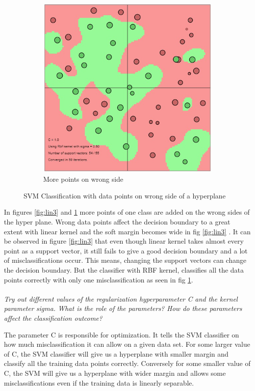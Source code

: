 \documentclass[12pt]{report}
\begin{document}
{\begin{figure}[ht]
\begin{subfigure}{.3\textwidth}
 			\includegraphics[width=.7\linewidth]{RBF_kernel_3.jpg}
 			\caption{More points on wrong side}
 			\label{fig:rbf3}
 		\end{subfigure}
	 	\caption{SVM Classification with data points on wrong side of a hyperplane}
	 	\label{fig:lin_rbf2}
	\end{figure}
 
    
In figures \ref{fig:lin3} and \ref{fig:rbf3} more points of one class are added on the wrong sides of the hyper plane. Wrong data points affect the decision boundary to a great extent with linear kernel and the soft margin becomes wide in fig \ref{fig:lin3} . It can be observed in figure \ref{fig:lin3} that even though linear kernel takes almost every point as a support vector, it still fails to give a good decision boundary and a lot of misclassifications occur. This means, changing the support vectors can change the decision boundary. But the classifier with RBF kernel, classifies all the data points correctly with only one misclassification as seen in fig \ref{fig:rbf3}. \\\\
\textit{Try out different values of the regularization hyperparameter C and the kernel parameter sigma. What is the role of the parameters? How do these parameters
affect the classification outcome?}
 
 The parameter C is responsible for optimization. It tells the SVM classifier on how much misclassification it can allow on a given data set. For some larger value of C, the SVM classifier will give us a hyperplane with smaller margin and classify all the training data points correctly. Conversely for some smaller value of C, the SVM will give us a hyperplane with wider margin and allows some misclassifications even if the training data is linearly separable.

}
\end{document}
